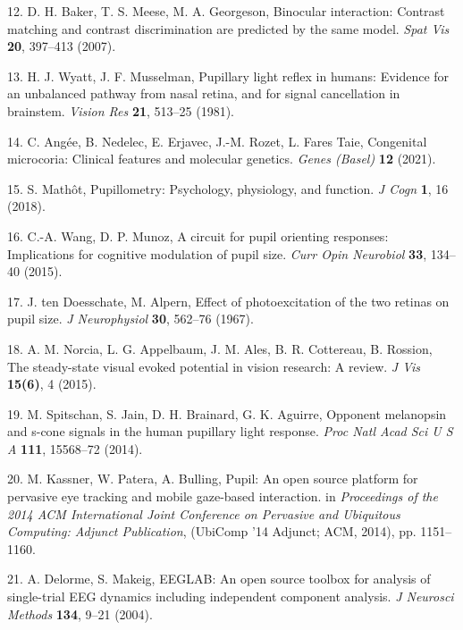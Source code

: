 \documentclass[
]{article}
\begin{document}
\leavevmode\hypertarget{ref-Baker2007}{}%
12. D. H. Baker, T. S. Meese, M. A. Georgeson, Binocular interaction: Contrast matching and contrast discrimination are predicted by the same model. \emph{Spat Vis} \textbf{20}, 397--413 (2007).

\leavevmode\hypertarget{ref-Wyatt1981}{}%
13. H. J. Wyatt, J. F. Musselman, Pupillary light reflex in humans: Evidence for an unbalanced pathway from nasal retina, and for signal cancellation in brainstem. \emph{Vision Res} \textbf{21}, 513--25 (1981).

\leavevmode\hypertarget{ref-Angee2021}{}%
14. C. Angée, B. Nedelec, E. Erjavec, J.-M. Rozet, L. Fares Taie, Congenital microcoria: Clinical features and molecular genetics. \emph{Genes (Basel)} \textbf{12} (2021).

\leavevmode\hypertarget{ref-Mathot2018}{}%
15. S. Mathôt, Pupillometry: Psychology, physiology, and function. \emph{J Cogn} \textbf{1}, 16 (2018).

\leavevmode\hypertarget{ref-Wang2015}{}%
16. C.-A. Wang, D. P. Munoz, A circuit for pupil orienting responses: Implications for cognitive modulation of pupil size. \emph{Curr Opin Neurobiol} \textbf{33}, 134--40 (2015).

\leavevmode\hypertarget{ref-Doesschate1967}{}%
17. J. ten Doesschate, M. Alpern, Effect of photoexcitation of the two retinas on pupil size. \emph{J Neurophysiol} \textbf{30}, 562--76 (1967).

\leavevmode\hypertarget{ref-Norcia2015}{}%
18. A. M. Norcia, L. G. Appelbaum, J. M. Ales, B. R. Cottereau, B. Rossion, The steady-state visual evoked potential in vision research: A review. \emph{J Vis} \textbf{15(6)}, 4 (2015).

\leavevmode\hypertarget{ref-Spitschan2014}{}%
19. M. Spitschan, S. Jain, D. H. Brainard, G. K. Aguirre, Opponent melanopsin and s-cone signals in the human pupillary light response. \emph{Proc Natl Acad Sci U S A} \textbf{111}, 15568--72 (2014).

\leavevmode\hypertarget{ref-Kassner2014}{}%
20. M. Kassner, W. Patera, A. Bulling, Pupil: An open source platform for pervasive eye tracking and mobile gaze-based interaction. in \emph{Proceedings of the 2014 ACM International Joint Conference on Pervasive and Ubiquitous Computing: Adjunct Publication}, (UbiComp '14 Adjunct; ACM, 2014), pp. 1151--1160.

\leavevmode\hypertarget{ref-Delorme2004}{}%
21. A. Delorme, S. Makeig, EEGLAB: An open source toolbox for analysis of single-trial EEG dynamics including independent component analysis. \emph{J Neurosci Methods} \textbf{134}, 9--21 (2004).
\end{document}
